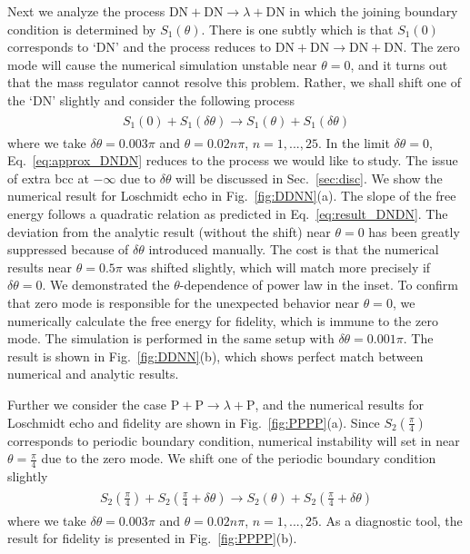 Next we analyze the process $\text{DN}+\text{DN}\rightarrow\lambda+\text{DN}$ in which the joining boundary condition is determined by $S_1(\theta)$. There is one subtly which is that $S_1(0)$ corresponds to `DN' and the process reduces to $\text{DN}+\text{DN}\rightarrow\text{DN}+\text{DN}$. The zero mode will cause the numerical simulation unstable near $\theta=0$, and it turns out that the mass regulator cannot resolve this problem. Rather, we shall shift one of the `DN' slightly and consider the following process
\begin{eqnarray}\begin{aligned}
\label{eq:approx_DNDN}
S_1(0)+S_1(\delta\theta)\rightarrow S_1(\theta)+S_1(\delta\theta)
\end{aligned}\end{eqnarray}
where we take $\delta\theta=0.003\pi$ and $\theta=0.02n\pi$, $n=1,...,25$. In the limit $\delta\theta=0$, Eq.~\eqref{eq:approx_DNDN} reduces to the process we would like to study. The issue of extra bcc at $-\infty$ due to $\delta\theta$ will be discussed in Sec.~\ref{sec:disc}. We show the numerical result for Loschmidt echo in Fig.~\ref{fig:DDNN}(a). The slope of the free energy follows a quadratic relation as predicted in Eq.~\eqref{eq:result_DNDN}. The deviation from the analytic result (without the shift) near $\theta=0$ has been greatly suppressed because of $\delta\theta$ introduced manually. The cost is that the numerical results near $\theta=0.5\pi$ was shifted slightly, which will match more precisely if $\delta\theta=0$. We demonstrated the $\theta$-dependence of power law in the inset. To confirm that zero mode is responsible for the unexpected behavior near $\theta=0$, we numerically calculate the free energy for fidelity, which is immune to the zero mode. The simulation is performed in the same setup with  $\delta\theta=0.001\pi$. The result is shown in Fig.~\ref{fig:DDNN}(b), which shows perfect match between numerical and analytic results. 

Further we consider the case $\text{P}+\text{P}\rightarrow\lambda+\text{P}$, and the numerical results for Loschmidt echo and fidelity are shown in Fig.~\ref{fig:PPPP}(a). Since $S_2(\frac{\pi}{4})$ corresponds to periodic boundary condition, numerical instability will set in near $\theta=\frac{\pi}{4}$ due to the zero mode. We shift one of the periodic boundary condition slightly 
\begin{eqnarray}\begin{aligned}
\label{eq:approx_DNDN}
S_2\left(\frac{\pi}{4}\right)+S_2\left(\frac{\pi}{4}+\delta\theta\right)\rightarrow S_2(\theta)+S_2\left(\frac{\pi}{4}+\delta\theta\right)
\end{aligned}\end{eqnarray}
where we take $\delta\theta=0.003\pi$ and $\theta=0.02n\pi$, $n=1,...,25$. 
As a diagnostic tool, the result for fidelity is presented in Fig.~\ref{fig:PPPP}(b). 

